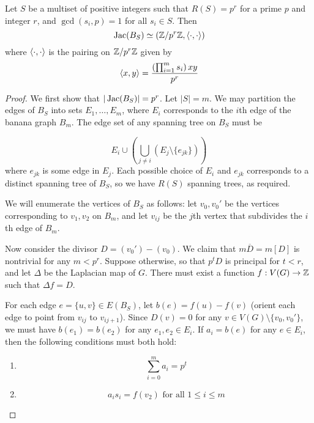 \documentclass{amsart}
\begin{document}
\begin{prop}
  \label{prop:banana_pairing}
  Let $S$ be a multiset of positive integers such that $R(S) = p^r$
  for a prime $p$ and integer $r$, and $\gcd(s_i, p) = 1$ for all $s_i
  \in S$. Then
  \begin{equation*}
    \operatorname{Jac}(B_S) \simeq (\mathbb{Z}/p^r\mathbb{Z}, \langle \cdot, \cdot \rangle)
  \end{equation*}
  where $\langle \cdot, \cdot \rangle$ is the pairing on $\mathbb{Z}/p^r\mathbb{Z}$ given by
  \begin{equation*}
    \langle x, y \rangle = \frac{\left(\prod_{i=1}^ms_i\right)xy}{p^r}
  \end{equation*}
\end{prop}
\begin{proof}
  We first show that $|\operatorname{Jac}(B_S)| = p^r$. Let $|S| = m$. We may
  partition the edges of $B_S$ into sets $E_1, \ldots, E_m$, where
  $E_i$ corresponds to the $i$th edge of the banana graph $B_m$. The
  edge set of any spanning tree on $B_S$ must be

  \begin{equation*}
    E_i \cup \left(\bigcup_{j \ne i} (E_j \setminus \{e_{jk}\})\right)
  \end{equation*}
  where $e_{jk}$ is some edge in $E_j$. Each possible choice of $E_i$
  and $e_{jk}$ corresponds to a distinct spanning tree of $B_S$, so we
  have $R(S)$ spanning trees, as required.

  We will enumerate the vertices of $B_S$ as follows: let $v_0, v_0'$
  be the vertices corresponding to $v_1, v_2$ on $B_m$, and let
  $v_{ij}$ be the $j$th vertex that subdivides the $i$th edge of
  $B_m$.

  Now consider the divisor $D = (v_0') - (v_0)$. We claim that
  $m\overline{D} = m[D]$ is nontrivial for any $m < p^r$. Suppose
  otherwise, so that $p^tD$ is principal for $t < r$, and let $\Delta$
  be the Laplacian map of $G$. There must exist a function $f:V(G) \to
  \mathbb{Z}$ such that $\Delta f = D$.

  For each edge $e = \{u, v\} \in E(B_S)$, let $b(e) = f(u) - f(v)$
  (orient each edge to point from $v_{ij}$ to $v_{ij+1}$). Since $D(v)
  = 0$ for any $v \in V(G) \setminus \{v_0, v_0'\}$, we must have
  $b(e_1) = b(e_2)$ for any $e_1, e_2 \in E_i$.  If $a_i = b(e)$ for
  any $e \in E_i$, then the following conditions must both hold:
  
  \begin{enumerate}
    \item 
      \[
      \sum_{i=0}^m a_i = p^t
      \]
    \item
      \[
      a_is_i = f(v_2) \textrm{ for all } 1 \le i \le m
      \]
  \end{enumerate}


\end{proof}
\end{document}
